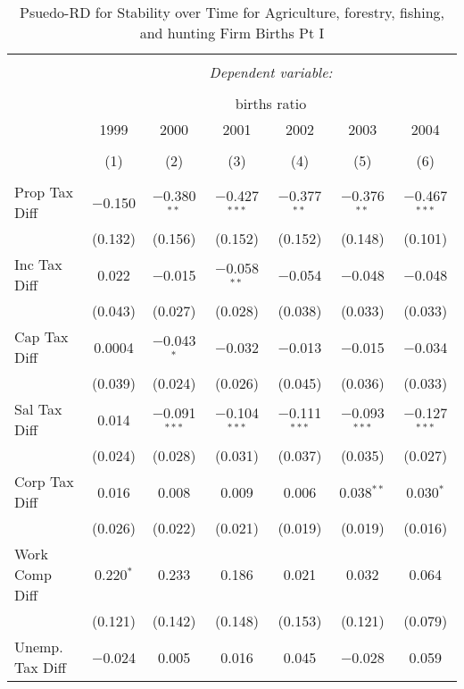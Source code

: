 
\begin{table}[!htbp] \centering 
  \caption{Psuedo-RD for Stability over Time for  Agriculture, forestry, fishing, and hunting Firm Births Pt I} 
  \label{11year} 
\small 
\begin{tabular}{@{\extracolsep{5pt}}lcccccc} 
\\[-1.8ex]\hline 
\hline \\[-1.8ex] 
 & \multicolumn{6}{c}{\textit{Dependent variable:}} \\ 
\cline{2-7} 
\\[-1.8ex] & \multicolumn{6}{c}{births ratio} \\ 
 & 1999 & 2000 & 2001 & 2002 & 2003 & 2004 \\ 
\\[-1.8ex] & (1) & (2) & (3) & (4) & (5) & (6)\\ 
\hline \\[-1.8ex] 
 Prop Tax Diff & $-$0.150 & $-$0.380$^{**}$ & $-$0.427$^{***}$ & $-$0.377$^{**}$ & $-$0.376$^{**}$ & $-$0.467$^{***}$ \\ 
  & (0.132) & (0.156) & (0.152) & (0.152) & (0.148) & (0.101) \\ 
  Inc Tax Diff & 0.022 & $-$0.015 & $-$0.058$^{**}$ & $-$0.054 & $-$0.048 & $-$0.048 \\ 
  & (0.043) & (0.027) & (0.028) & (0.038) & (0.033) & (0.033) \\ 
  Cap Tax Diff & 0.0004 & $-$0.043$^{*}$ & $-$0.032 & $-$0.013 & $-$0.015 & $-$0.034 \\ 
  & (0.039) & (0.024) & (0.026) & (0.045) & (0.036) & (0.033) \\ 
  Sal Tax Diff & 0.014 & $-$0.091$^{***}$ & $-$0.104$^{***}$ & $-$0.111$^{***}$ & $-$0.093$^{***}$ & $-$0.127$^{***}$ \\ 
  & (0.024) & (0.028) & (0.031) & (0.037) & (0.035) & (0.027) \\ 
  Corp Tax Diff & 0.016 & 0.008 & 0.009 & 0.006 & 0.038$^{**}$ & 0.030$^{*}$ \\ 
  & (0.026) & (0.022) & (0.021) & (0.019) & (0.019) & (0.016) \\ 
  Work Comp Diff & 0.220$^{*}$ & 0.233 & 0.186 & 0.021 & 0.032 & 0.064 \\ 
  & (0.121) & (0.142) & (0.148) & (0.153) & (0.121) & (0.079) \\ 
  Unemp. Tax Diff & $-$0.024 & 0.005 & 0.016 & 0.045 & $-$0.028 & 0.059 \\ 

\end{tabular}
\end{table}

